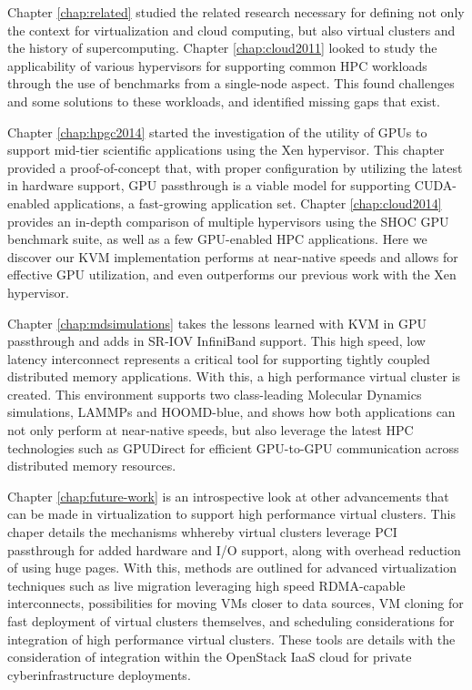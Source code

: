 
Chapter \ref{chap:related} studied the related research necessary for defining not only the context for virtualization and cloud computing, but also virtual clusters and the history of supercomputing.  Chapter \ref{chap:cloud2011} looked to study the applicability of various hypervisors for supporting common HPC workloads through the use of benchmarks from a single-node aspect.  This found challenges and some solutions to these workloads, and identified missing gaps that exist. 

Chapter \ref{chap:hpgc2014} started the investigation of the utility of GPUs to support mid-tier scientific applications using the Xen hypervisor. This chapter provided a proof-of-concept that, with proper configuration by utilizing the latest in hardware support, GPU passthrough is a viable model for supporting CUDA-enabled applications, a fast-growing application set. Chapter \ref{chap:cloud2014} provides an in-depth comparison of multiple hypervisors using the SHOC GPU benchmark suite, as well as a few GPU-enabled HPC applications. Here we discover our KVM implementation performs at near-native speeds and allows for effective GPU utilization, and even outperforms our previous work with the Xen hypervisor. 

Chapter \ref{chap:mdsimulations} takes the lessons learned with KVM in GPU passthrough and adds in SR-IOV InfiniBand support. This high speed, low latency interconnect represents a critical tool for supporting tightly coupled distributed memory applications. With this, a high performance virtual cluster is created. This environment supports two class-leading Molecular Dynamics simulations, LAMMPs and HOOMD-blue, and shows how both applications can not only perform at near-native speeds, but also leverage the latest HPC technologies such as GPUDirect for efficient GPU-to-GPU communication across distributed memory resources. %

Chapter \ref{chap:future-work} is an introspective look at other advancements that can be made in virtualization to support high performance virtual clusters. This chaper details the mechanisms whhereby virtual clusters leverage PCI passthrough for added hardware and I/O support, along with overhead reduction of using huge pages.  With this, methods are outlined for advanced virtualization techniques such as live migration leveraging high speed RDMA-capable interconnects, possibilities for moving VMs closer to data sources, VM cloning for fast deployment of virtual clusters themselves, and scheduling considerations for integration of high performance virtual clusters. These tools are details with the consideration of integration within the OpenStack IaaS cloud for private cyberinfrastructure deployments.


